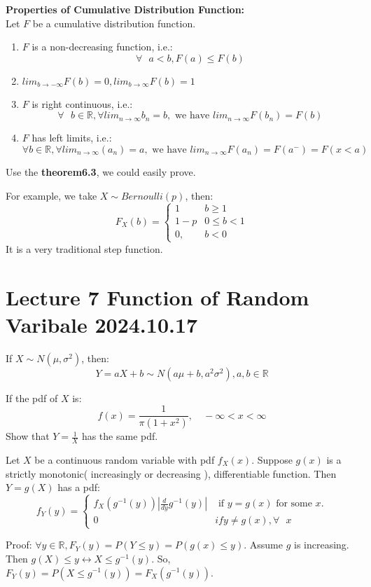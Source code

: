 \documentclass{article}
\begin{document}
\begin{theorem}
    \textbf{Properties of Cumulative Distribution Function:}\\
    Let $F$ be a cumulative distribution function.
    \begin{enumerate}
        \item $F$ is a non-decreasing function, i.e.:
        $$ \forall \text{ } a < b, F(a) \leq F(b)$$
        \item $lim_{b\rightarrow-\infty}F(b) = 0, lim_{b\rightarrow\infty}F(b) = 1$
        \item $F$ is right continuous, i.e.:
        $$\forall \text{ } b \in \mathbb{R}, \forall lim_{n \rightarrow \infty}b_n = b, \text{ we have } lim_{n \rightarrow \infty}F(b_n) = F(b) $$
        \item $F$ has left limits, i.e.:
        $$\forall b \in \mathbb{R}, \forall lim_{n \rightarrow \infty}(a_n) = a, \text{ we have } lim_{n \rightarrow \infty}F(a_n) = F(a^{-}) = F(x < a)$$
    \end{enumerate}
\end{theorem}
Use the \textbf{theorem6.3}, we could easily prove.

For example, we take $X \sim Bernoulli(p)$, then:
\[
F_X(b) = 
\begin{cases}
    1 & b \geq 1 \\
    1-p & 0 \leq b < 1 \\
    0, & b < 0
\end{cases}
\]
It is a very traditional step function.


\section{Lecture 7 Function of Random Varibale 2024.10.17}
\begin{theorem}
    If $X \sim N(\mu, \sigma^2)$, then:
    $$Y = aX+b \sim N(a\mu + b, a^2\sigma^2), a,b \in \mathbb{R}$$
\end{theorem}


\begin{quiz}
    If the pdf of $X$ is:
    $$f(x) = \frac{1}{\pi(1+x^2)}, \quad -\infty < x < \infty$$
    Show that $Y = \frac{1}{X}$ has the same pdf.
\end{quiz}

\begin{theorem}
    Let $X$ be a continuous random variable with pdf $f_X(x)$. Suppose $g(x)$ is a strictly monotonic( increasingly or decreasing ), differentiable function. Then $Y = g(X)$ has a pdf:
    \[
    f_Y(y) = 
    \begin{cases}
        f_X(g^{-1}(y))|\frac{d}{dy}g^{-1}(y)| & \text{ if } y = g(x) \text{ for some } x.\\
        0 & if y \neq g(x), \forall \text{ } x
    \end{cases}
    \]
\end{theorem}
Proof: $\forall y \in \mathbb{R}, F_Y(y) = P(Y \leq y) = P(g(x) \leq y)$. Assume $g$ is increasing. Then $g(X) \leq y \leftrightarrow X \leq g^{-1}(y)$. So, $F_Y(y) = P(X \leq g^{-1}(y)) = F_X(g^{-1}(y))$.
\end{document}

